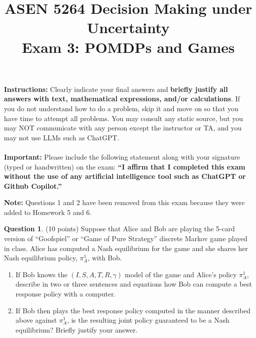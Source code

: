 \documentclass{article}
\title{ASEN 5264 Decision Making under Uncertainty\\
       Exam 3: POMDPs and Games}
\theoremstyle{definition}
\newtheorem{question}[thm]{Question}
\begin{document}
\maketitle


\noindent \textbf{Instructions:} Clearly indicate your final answers and \textbf{briefly justify all answers with text, mathematical expressions, and/or calculations}. If you do not understand how to do a problem, skip it and move on so that you have time to attempt all problems. You may consult any static source, but you may NOT communicate with any person except the instructor or TA, and you may not use LLMs such as ChatGPT.
\\
\\
\noindent\textbf{Important:} Please include the following statement along with your signature (typed or handwritten) on the exam: \textbf{``I affirm that I completed this exam without the use of any artificial intelligence tool such as ChatGPT or Github Copilot.''}

\clearpage

\noindent\textbf{Note:} Questions 1 and 2 have been removed from this exam because they were added to Homework 5 and 6.

\begin{question} (10 points)
    Suppose that Alice and Bob are playing the 5-card version of ``Goofspiel'' or ``Game of Pure Strategy'' discrete Markov game played in class. Alice has computed a Nash equilibrium for the game and she shares her Nash equilibrium policy, $\pi^1_A$, with Bob.
    \begin{enumerate}[label=\alph*)]
        \item If Bob knows the $(I, S, A, T, R, \gamma)$ model of the game and Alice's policy $\pi^1_A$, describe in two or three sentences and equations how Bob can compute a best response policy with a computer.
        \item If Bob then plays the best response policy computed in the manner described above against $\pi^1_A$, is the resulting joint policy guaranteed to be a Nash equilibrium? Briefly justify your answer.
    \end{enumerate}
\end{question}
\end{document}
